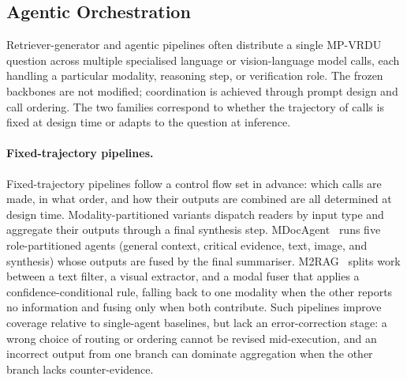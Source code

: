 \documentclass[11pt]{article}
\begin{document}
\subsection{Agentic Orchestration}
\label{sec:agent-orchestration}

Retriever-generator and agentic pipelines often distribute a single MP-VRDU question across multiple specialised language or vision-language model calls, each handling a particular modality, reasoning step, or verification role. The frozen backbones are not modified; coordination is achieved through prompt design and call ordering. The two families correspond to whether the trajectory of calls is fixed at design time or adapts to the question at inference.

\paragraph{Fixed-trajectory pipelines.} Fixed-trajectory pipelines follow a control flow set in advance: which calls are made, in what order, and how their outputs are combined are all determined at design time. Modality-partitioned variants dispatch readers by input type and aggregate their outputs through a final synthesis step. MDocAgent~\cite{han2025mdocagent} runs five role-partitioned agents (general context, critical evidence, text, image, and synthesis) whose outputs are fused by the final summariser. M2RAG~\cite{duan2025m2rag} splits work between a text filter, a visual extractor, and a modal fuser that applies a confidence-conditional rule, falling back to one modality when the other reports no information and fusing only when both contribute. Such pipelines improve coverage relative to single-agent baselines, but lack an error-correction stage: a wrong choice of routing or ordering cannot be revised mid-execution, and an incorrect output from one branch can dominate aggregation when the other branch lacks counter-evidence.
\end{document}
